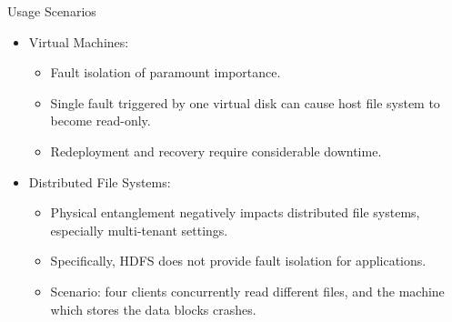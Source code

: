 \documentclass[aspectratio=169]{beamer}
\newcommand{\bi}{\begin{itemize}}
\newcommand{\ei}{\end{itemize}}
\begin{document}
\begin{frame}{Usage Scenarios}
    \bi
\item Virtual Machines:
    \bi
    \pause
\item Fault isolation of paramount importance.
\item Single fault triggered by one virtual disk can cause host file system to
    become read-only.
\item Redeployment and recovery require considerable downtime.
    \ei
    \pause
\item Distributed File Systems:
    \bi
    \pause
\item Physical entanglement negatively impacts distributed file systems, especially multi-tenant
    settings.
\item Specifically, HDFS does not provide fault isolation for applications.
\item Scenario: four clients concurrently read different files, and the machine
    which stores the data blocks crashes.
    \ei
    \ei
\end{frame}
\end{document}
